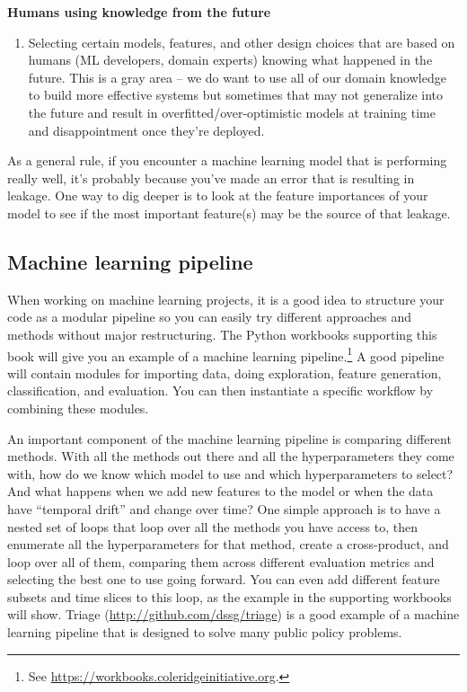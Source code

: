 \documentclass[]{krantz}
\providecommand{\tightlist}{%
  \setlength{\itemsep}{0pt}\setlength{\parskip}{0pt}}
\begin{document}
\textbf{Humans using knowledge from the future}

\begin{enumerate}
\def\labelenumi{\arabic{enumi}.}
\setcounter{enumi}{8}
\tightlist
\item
  Selecting certain models, features, and other design choices that are
  based on humans (ML developers, domain experts) knowing what happened
  in the future. This is a gray area -- we do want to use all of our
  domain knowledge to build more effective systems but sometimes that
  may not generalize into the future and result in
  overfitted/over-optimistic models at training time and disappointment
  once they're deployed.
\end{enumerate}

As a general rule, if you encounter a machine learning model that is
performing really well, it's probably because you've made an error that
is resulting in leakage. One way to dig deeper is to look at the feature
importances of your model to see if the most important feature(s) may be
the source of that leakage.

\subsection{Machine learning pipeline}\label{machine-learning-pipeline}

When working on machine learning projects, it is a good idea to
structure your code as a modular pipeline so you can easily try
different approaches and methods without major restructuring. The Python
workbooks supporting this book will give you an example of a machine
learning pipeline.\footnote{See
  \url{https://workbooks.coleridgeinitiative.org}.} A good pipeline will
contain modules for importing data, doing exploration, feature
generation, classification, and evaluation. You can then instantiate a
specific workflow by combining these modules.

An important component of the machine learning pipeline is comparing
different methods. With all the methods out there and all the
hyperparameters they come with, how do we know which model to use and
which hyperparameters to select? And what happens when we add new
features to the model or when the data have ``temporal drift'' and
change over time? One simple approach is to have a nested set of loops
that loop over all the methods you have access to, then enumerate all
the hyperparameters for that method, create a cross-product, and loop
over all of them, comparing them across different evaluation metrics and
selecting the best one to use going forward. You can even add different
feature subsets and time slices to this loop, as the example in the
supporting workbooks will show. Triage
(\url{http://github.com/dssg/triage}) is a good example of a machine
learning pipeline that is designed to solve many public policy problems.
\end{document}
